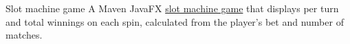 \datedsubsection{}
{Slot machine game}
{}
{A Maven JavaFX \href{https://github.com/jacobarchambault/slotmachine}{slot machine game} that displays per turn and total winnings on each spin, calculated from the player's bet and number of matches.}
